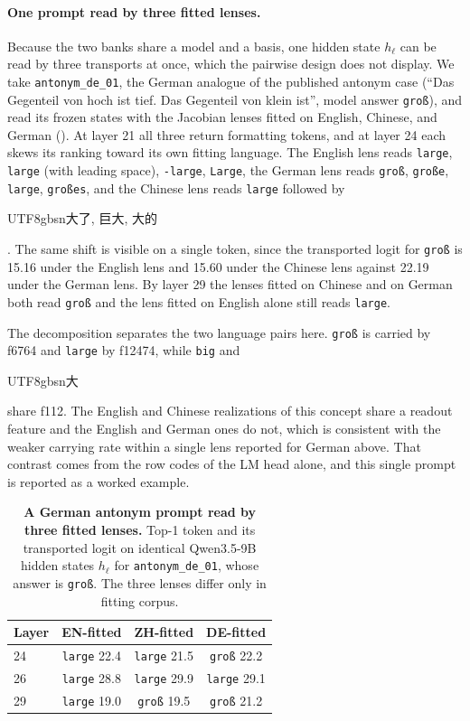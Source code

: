 \paragraph{One prompt read by three fitted lenses.}
Because the two banks share a model and a basis, one hidden state \(h_\ell\) can be
read by three transports at once, which the pairwise design does not
display. We take \texttt{antonym\_de\_01}, the German analogue of the
published antonym case (``Das Gegenteil von hoch ist
tief. Das Gegenteil von klein ist'', model answer
\texttt{groß}), and read its frozen states with the Jacobian lenses fitted on
English, Chinese, and German
(). At layer 21 all three
return formatting tokens, and at layer 24 each skews its ranking toward its own
fitting language. The English lens reads \texttt{large}, \texttt{ large}
(with leading space), \texttt{-large}, \texttt{Large}, the German lens reads
\texttt{groß}, \texttt{große}, \texttt{large}, \texttt{großes}, and the Chinese
lens reads \texttt{large} followed by
\begin{CJK*}{UTF8}{gbsn}大了, 巨大, 大的\end{CJK*}. The same shift is
visible on a single token, since the transported logit for \texttt{groß}
is 15.16 under the English lens and 15.60 under the Chinese lens against
22.19 under the German lens. By layer 29 the lenses fitted on Chinese
and on German both read \texttt{groß} and the lens fitted on English alone still
reads \texttt{large}.

The decomposition separates the two language pairs here. \texttt{groß} is
carried by f6764 and \texttt{large} by f12474, while \texttt{big} and
\begin{CJK*}{UTF8}{gbsn}大\end{CJK*} share f112. The English and Chinese
realizations of this concept share a readout feature and the English and
German ones do not, which is consistent with the weaker
carrying rate within a single lens reported for German above. That contrast comes from the
row codes of the LM head alone, and this single prompt is reported as a worked
example.

\begin{table}[!tbp]
\caption{\textbf{A German antonym prompt read by three fitted lenses.}
Top-1 token and its transported logit on identical Qwen3.5-9B hidden
states \(h_\ell\) for \texttt{antonym\_de\_01}, whose answer is \texttt{groß}. The
three lenses differ only in fitting corpus.}
\label{tab:app-cross-lens-de-antonym-layers}
\centering
\footnotesize
\setlength{\tabcolsep}{5pt}
\renewcommand{\arraystretch}{1.08}
\begin{tabular}{@{}lccc@{}}
\toprule
Layer & EN-fitted & ZH-fitted & DE-fitted \\
\midrule
24 & \texttt{large} 22.4 & \texttt{large} 21.5 & \texttt{groß} 22.2 \\
26 & \texttt{large} 28.8 & \texttt{large} 29.9 & \texttt{large} 29.1 \\
29 & \texttt{large} 19.0 & \texttt{groß} 19.5 & \texttt{groß} 21.2 \\
\bottomrule
\end{tabular}
\end{table}

